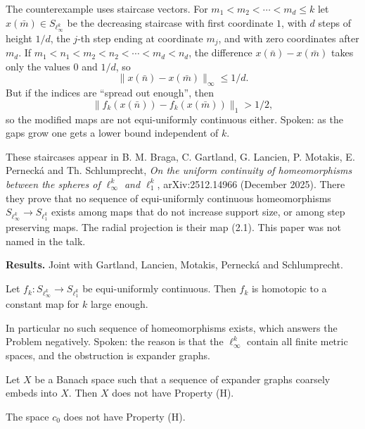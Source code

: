 The counterexample uses staircase vectors.
For $m_1 < m_2 < \cdots < m_d \le k$ let
$x(\bar m) \in S_{\ell_\infty^k}$ be the
decreasing staircase with first coordinate
$1$, with $d$ steps of height $1/d$, the
$j$-th step ending at coordinate $m_j$, and
with zero coordinates after $m_d$. If
$m_1 < n_1 < m_2 < n_2 < \cdots < m_d < n_d$,
the difference $x(\bar n) - x(\bar m)$ takes
only the values $0$ and $1/d$, so
$$
\|x(\bar n) - x(\bar m)\|_\infty \le 1/d.
$$
But if the indices are ``spread out
enough'', then
$$
\|f_k(x(\bar n)) - f_k(x(\bar m))\|_1
> 1/2,
$$
so the modified maps are not equi-uniformly
continuous either. Spoken: as the gaps grow
one gets a lower bound independent of $k$.

\begin{remark}
\label{remark-first-paper-staircase}
These staircases appear in B. M. Braga,
C. Gartland, G. Lancien, P. Motakis,
E. Perneck\'a and Th. Schlumprecht, \emph{On
the uniform continuity of homeomorphisms
between the spheres of $\ell_\infty^k$ and
$\ell_1^k$}, arXiv:2512.14966 (December
2025). There they prove that no sequence of
equi-uniformly continuous homeomorphisms
$S_{\ell_\infty^k} \to S_{\ell_1^k}$ exists
among maps that do not increase support size,
or among step preserving maps. The radial
projection is their map (2.1). This paper was
not named in the talk.
\end{remark}

\medskip\noindent
{\bf Results.} Joint with Gartland, Lancien,
Motakis, Pernecká and Schlumprecht.

\begin{theorem}
\label{theorem-braga-et-al-null-homotopic}
Let
$f_k : S_{\ell_\infty^k} \to S_{\ell_1^k}$
be equi-uniformly continuous. Then $f_k$ is
homotopic to a constant map for $k$ large
enough.
\end{theorem}

\noindent
In particular no such sequence of
homeomorphisms exists, which answers the
Problem negatively. Spoken: the reason is
that the $\ell_\infty^k$ contain all finite
metric spaces, and the obstruction is
expander graphs.

\begin{theorem}
\label{theorem-expanders-prevent-h}
Let $X$ be a Banach space such that a
sequence of expander graphs coarsely embeds
into $X$. Then $X$ does not have
Property (H).
\end{theorem}

\begin{corollary}
\label{corollary-c0-not-h}
The space $c_0$ does not have Property (H).
\end{corollary}

